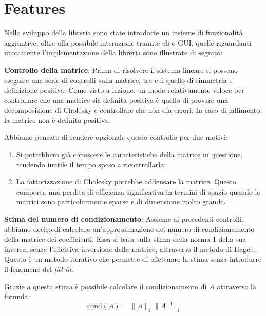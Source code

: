\section{Features}

Nello sviluppo della libreria sono state introdotte un insieme di funzionalità aggiuntive, oltre alla possibile interazione tramite cli o GUI, quelle riguardanti unicamente l'implementazione della libreria sono illustrate di seguito:

\begin{itemize}
	\begin{item}
		\textbf{Controllo della matrice}: Prima di risolvere il sistema lineare si possono eseguire una serie di controlli sulla matrice, tra cui quello di simmetria e definizione positiva. Come visto a lezione, un modo relativamente veloce per controllare che una matrice sia definita positiva è quello di provare una decomposizione di Cholesky e controllare che non dia errori. In caso di fallimento, la matrice non è definita positiva.
		
		Abbiamo pensato di rendere opzionale questo controllo per due motivi:
			\begin{enumerate}
				\item Si potrebbero già conoscere le caratteristiche della matrice in questione, rendendo inutile il tempo speso a ricontrollarla;
				\item La fattorizzazione di Cholesky potrebbe addensare la matrice. Questo comporta una perdita di efficienza significativa in termini di spazio quando le matrici sono particolarmente sparse e di dimensione molto grande.
			\end{enumerate}
	\end{item}
	\begin{item}
		\textbf{Stima del numero di condizionamento}: Assieme ai precedenti controlli, abbiamo deciso di calcolare un'approssimazione del numero di condizionamento della matrice dei coefficienti. Essa si basa sulla stima della norma 1 della sua inversa, senza l'effettiva inversione della matrice, attraverso il metodo di Hager \cite{hager, hager2}. Questo è un metodo iterativo che permette di effettuare la stima senza introdurre il fenomeno del \textit{fill-in}.
		
		Grazie a questa stima è possibile calcolare il condizionamento di $A$ attraverso la formula:
		$$ \textrm{cond}(A) = \|A\|_1  \|A^{-1}||_1$$
			

\end{item}
\end{itemize}

